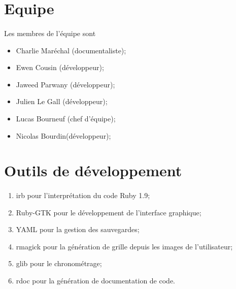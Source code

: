 \section {Equipe}
        \paragraph*{}
        Les membres de l'équipe sont 
        \begin{itemize}
                \item Charlie Maréchal (documentaliste);
                \item Ewen Cousin (développeur);
                \item Jaweed Parwany (développeur);
                \item Julien Le Gall (développeur);
                \item Lucas Bourneuf (chef d'équipe);
                \item Nicolas Bourdin(développeur);
        \end{itemize}


\section{Outils de développement}
        \paragraph*{}
        \begin{enumerate}
                \item irb pour l'interprétation du code Ruby 1.9;
                \item Ruby-GTK pour le développement de l'interface graphique;
                \item YAML pour la gestion des sauvegardes; %
                \item rmagick pour la génération de grille depuis les images de l'utilisateur;
                \item glib pour le chronométrage;
                \item rdoc pour la génération de documentation de code.
        \end{enumerate}



